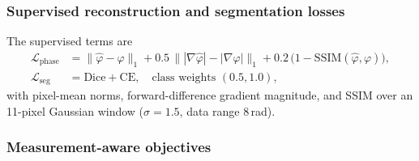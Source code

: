 \documentclass[11pt]{article}
\newcommand{\Lphase}{\mathcal{L}_\mathrm{phase}}
\newcommand{\Lseg}{\mathcal{L}_\mathrm{seg}}
\begin{document}
\subsubsection{Supervised reconstruction and segmentation losses}
\label{sec:obj-sup}

The supervised terms are
\begin{align}
\Lphase &= \|\hat\varphi-\varphi\|_1
         + 0.5\,\bigl\||\nabla\hat\varphi|-|\nabla\varphi|\bigr\|_1
         + 0.2\,\bigl(1-\mathrm{SSIM}(\hat\varphi,\varphi)\bigr),
\label{eq:lphase}\\
\Lseg   &= \mathrm{Dice} + \mathrm{CE},\quad \text{class weights } (0.5, 1.0),
\label{eq:lseg}
\end{align}
with pixel-mean norms, forward-difference gradient magnitude, and SSIM over an
11-pixel Gaussian window ($\sigma=1.5$, data range 8\,rad).

\subsubsection{Measurement-aware objectives}
\label{sec:obj-mawo}
\end{document}

